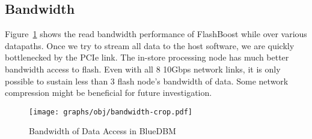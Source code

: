 \subsection{Bandwidth}

Figure~\ref{fig:result_bandwidth} shows the read bandwidth performance of
FlashBoost while over various datapaths. Once we try to stream all data to the
host software, we are quickly bottlenecked by the PCIe link. The in-store
processing node has much better bandwidth access to flash. Even with all 8
10Gbps network links, it is only possible to sustain less than 3 flash node's
bandwidth of data. Some network compression might be beneficial for future
investigation.

\begin{figure}[h]
	\begin{center}
	\texttt{[image: graphs/obj/bandwidth-crop.pdf]}
	\caption{Bandwidth of Data Access in BlueDBM}
	\label{fig:result_bandwidth}
	\end{center}
\end{figure}


